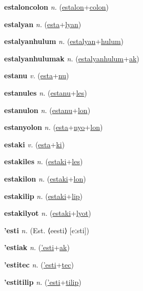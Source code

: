 \textbf{\hypertarget{estaloncolon}{estaloncolon}} \textit{n.} (\hyperlink{estalon}{estalon}+\allowbreak \hyperlink{colon}{colon})


\textbf{\hypertarget{estalyan}{estalyan}} \textit{n.} (\hyperlink{esta}{esta}+\allowbreak \hyperlink{lyan}{lyan})


\textbf{\hypertarget{estalyanhulum}{estalyanhulum}} \textit{n.} (\hyperlink{estalyan}{estalyan}+\allowbreak \hyperlink{hulum}{hulum})


\textbf{\hypertarget{estalyanhulumak}{estalyanhulumak}} \textit{n.} (\hyperlink{estalyanhulum}{estalyanhulum}+\allowbreak \hyperlink{ak}{ak})


\textbf{\hypertarget{estanu}{estanu}} \textit{v.} (\hyperlink{esta}{esta}+\allowbreak \hyperlink{nu}{nu})


\textbf{\hypertarget{estanules}{estanules}} \textit{n.} (\hyperlink{estanu}{estanu}+\allowbreak \hyperlink{les}{les})


\textbf{\hypertarget{estanulon}{estanulon}} \textit{n.} (\hyperlink{estanu}{estanu}+\allowbreak \hyperlink{lon}{lon})


\textbf{\hypertarget{estanyolon}{estanyolon}} \textit{n.} (\hyperlink{esta}{esta}+\allowbreak \hyperlink{nyo}{nyo}+\allowbreak \hyperlink{lon}{lon})


\textbf{\hypertarget{estaki}{estaki}} \textit{v.} (\hyperlink{esta}{esta}+\allowbreak \hyperlink{ki}{ki})


\textbf{\hypertarget{estakiles}{estakiles}} \textit{n.} (\hyperlink{estaki}{estaki}+\allowbreak \hyperlink{les}{les})


\textbf{\hypertarget{estakilon}{estakilon}} \textit{n.} (\hyperlink{estaki}{estaki}+\allowbreak \hyperlink{lon}{lon})


\textbf{\hypertarget{estakilip}{estakilip}} \textit{n.} (\hyperlink{estaki}{estaki}+\allowbreak \hyperlink{lip}{lip})


\textbf{\hypertarget{estakilyot}{estakilyot}} \textit{n.} (\hyperlink{estaki}{estaki}+\allowbreak \hyperlink{lyot}{lyot})


\textbf{\hypertarget{'esti}{'esti}} \textit{n.} (Est. ⟨eesti⟩ [eːsti])


\textbf{\hypertarget{'estiak}{'estiak}} \textit{n.} (\hyperlink{'esti}{'esti}+\allowbreak \hyperlink{ak}{ak})


\textbf{\hypertarget{'estitec}{'estitec}} \textit{n.} (\hyperlink{'esti}{'esti}+\allowbreak \hyperlink{tec}{tec})


\textbf{\hypertarget{'estitilip}{'estitilip}} \textit{n.} (\hyperlink{'esti}{'esti}+\allowbreak \hyperlink{tilip}{tilip})


